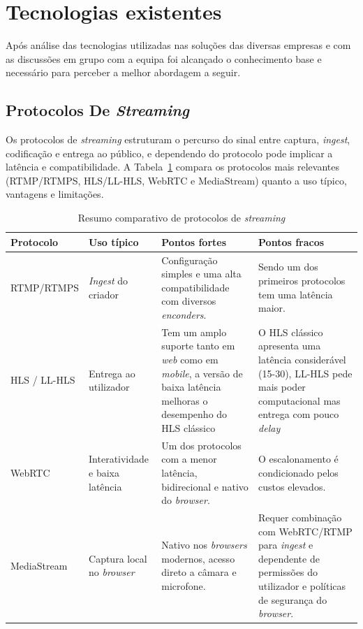 \section{Tecnologias existentes} 

Após análise das tecnologias utilizadas nas soluções das diversas empresas e com as discussões em grupo com a equipa foi alcançado o conhecimento base e necessário para perceber a melhor abordagem a seguir.

\subsection{Protocolos De \textit{Streaming}}

Os protocolos de \textit{streaming} estruturam o percurso do sinal entre captura, \textit{ingest}, codificação e entrega ao público, e dependendo do protocolo pode implicar a latência e compatibilidade. A Tabela~\ref{tab:streaming-protocols-comparativa} compara os protocolos mais relevantes (RTMP/RTMPS, HLS/LL-HLS, WebRTC e MediaStream) quanto a uso típico, vantagens e limitações.

\begin{table}[H]
\centering
\caption{Resumo comparativo de protocolos de \textit{streaming}}
\label{tab:streaming-protocols-comparativa}
\begingroup
\small
\setlength{\tabcolsep}{4pt}
\renewcommand{\arraystretch}{1.05}
\begin{tabular}{|p{3cm}|p{3cm}|p{4cm}|p{4cm}|}
\hline
\textbf{Protocolo} & \textbf{Uso típico} & \textbf{Pontos fortes} & \textbf{Pontos fracos} \\
\hline
RTMP/RTMPS \cite{Chang2011RTMPHTTP} & \textit{Ingest} do criador & Configuração simples e uma alta compatibilidade com diversos \textit{enconders}. & Sendo um dos primeiros protocolos tem uma latência maior. \\
\hline
HLS / LL-HLS \cite{Bentaleb2022LLDASHHLS} & Entrega ao utilizador & Tem um amplo suporte tanto em \textit{web} como em \textit{mobile}, a versão de baixa latência melhoras o desempenho do HLS clássico & O HLS clássico apresenta uma latência considerável (15-30), LL-HLS pede mais poder computacional mas entrega com pouco \textit{delay} \\
\hline
WebRTC \cite{Nurminen2013P2PWebRTC} & Interatividade e baixa latência & Um dos protocolos com a menor latência, bidirecional e nativo do \textit{browser}. & O escalonamento é condicionado pelos custos elevados. \\
\hline
{MediaStream} & Captura local no \textit{browser} & Nativo nos \textit{browsers} modernos, acesso direto a câmara e microfone. & Requer combinação com WebRTC/RTMP para \textit{ingest} e dependente de permissões do utilizador e políticas de segurança do \textit{browser}. \\
\hline
\end{tabular}
\endgroup
\end{table}



